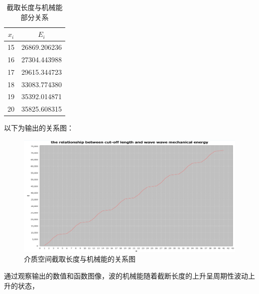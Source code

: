 \documentclass[lang=cn,a4paper,newtx]{elegantpaper}
\begin{document}
\begin{table}[ht]
  \centering
  \begin{tabular}{|c|c|}
  \hline
      $x_i$ & $E_i$ \\ \hline
      15 & 26869.206236 \\ \hline
      16 & 27304.443988 \\ \hline
      17 & 29615.344723 \\ \hline
      18 & 33083.774380 \\ \hline
      19 & 35392.014871 \\ \hline
      20 & 35825.608315 \\ \hline
  \end{tabular}
  \caption{截取长度与机械能部分关系}
\end{table}
以下为输出的关系图：
\begin{figure}[htbp]
  \centering
  \includegraphics[width=\textwidth]{./image/functionRelationChart}
  \caption{介质空间截取长度与机械能的关系图}
\end{figure}

通过观察输出的数值和函数图像，波的机械能随着截断长度的上升呈周期性波动上升的状态，
\end{document}
